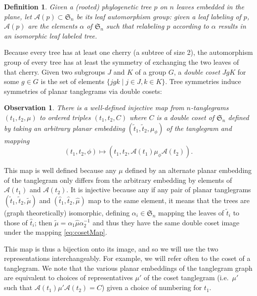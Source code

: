 \documentclass{amsart}
\newtheorem{definition}{Definition}
\newtheorem{observation}{Observation}
\newcommand{\fS}{\mathfrak S}
\newcommand{\aut}{\mathcal A}
\newcommand{\pairing}{\mu}
\begin{document}
\begin{definition}
Given a (rooted) phylogenetic tree $p$ on $n$ leaves embedded in the plane, let $\aut(p) \subset \fS_n$ be its leaf automorphism group: given a leaf labeling of $p$, $\aut(p)$ are the elements $\alpha$ of $\fS_n$ such that relabeling $p$ according to $\alpha$ results in an isomorphic leaf labeled tree.
\end{definition}
Because every tree has at least one cherry (a subtree of size 2), the automorphism group of every tree has at least the symmetry of exchanging the two leaves of that cherry.
Given two subgroups $J$ and $K$ of a group $G$, a \emph{double coset} $JgK$ for some $g \in G$ is the set of elements $\{jgk \mid j \in J, k \in K\}$.
Tree symmetries induce symmetries of planar tanglegrams via double cosets:
\begin{observation}
\label{obs:cosetMap}
There is a well-defined injective map from $n$-tanglegrams $(t_1, t_2, \pairing)$ to ordered triples $(t_1, t_2, C)$ where $C$ is a double coset of $\fS_n$ defined by taking an arbitrary planar embedding $(\tilde t_1, \tilde t_2, \pairing_\phi)$ of the tanglegram and mapping
\begin{equation}
\label{eq:cosetMap}
(t_1, t_2, \phi) \mapsto (t_1, t_2, \aut(t_1) \pairing_\phi \aut(t_2)).
\end{equation}
\end{observation}
This map is well defined because any $\pairing$ defined by an alternate planar embedding of the tanglegram only differs from the arbitrary embedding by elements of $\aut(t_1)$ and $\aut(t_2)$.
It is injective because any if any pair of planar tanglegrams $(\tilde t_1, \tilde t_2, \tilde \pairing)$ and $(\hat t_1, \hat t_2, \hat \pairing)$ map to the same element, it means that the trees are (graph theoretically) isomorphic, defining $\alpha_i \in \fS_n$ mapping the leaves of $\tilde t_i$ to those of $\hat t_i$; then $\tilde \pairing = \alpha_1 \hat \pairing \alpha_2^{-1}$ and thus they have the same double coset image under the mapping \eqref{eq:cosetMap}.

This map is thus a bijection onto its image, and so we will use the two representations interchangeably.
For example, we will refer often to the coset of a tanglegram.
We note that the various planar embeddings of the tanglegram graph are equivalent to choices of representatives $\pairing'$ of the coset tanglegram (i.e.\ $\pairing'$ such that $\aut(t_1) \pairing' \aut(t_2) = C$) given a choice of numbering for $t_1$.
\end{document}
